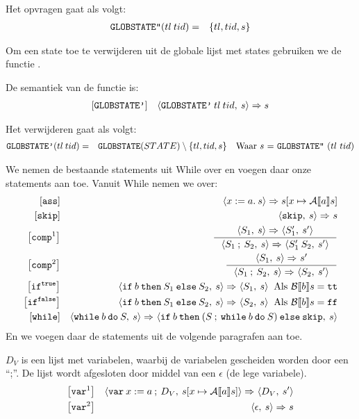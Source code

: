 Het opvragen gaat als volgt:
\begin{eqnarray*}
	\textnormal{\texttt{GLOBSTATE''}}(tl\:tid) &=& \{tl,tid,s\} \\
\end{eqnarray*}

Om een state toe te verwijderen uit de globale lijst met states gebruiken we de functie
.

De semantiek van de functie is:
\begin{eqnarray*}
\left[\textnormal{\texttt{GLOBSTATE'}}\right]&&
\langle\textnormal{\texttt{GLOBSTATE'}}\:tl\:tid,\:s\rangle => s
\end{eqnarray*}

Het verwijderen gaat als volgt:
\begin{eqnarray*}
	\textnormal{\texttt{GLOBSTATE'}}(tl\:tid) &=& \textnormal{\texttt{GLOBSTATE}}(STATE) \setminus \{tl,tid,s\} \quad \textrm{Waar \(s\) = \textnormal{\texttt{GLOBSTATE''}}
	(\(tl\) \(tid\))}\\
\end{eqnarray*}


We nemen de bestaande statements uit While over en voegen daar onze statements aan toe. Vanuit While nemen we over:
\begin{eqnarray*}
\left[\kw{ass}\right]&& \langle x:=a.\:s\rangle=>s[x\mapsto\mathcal{A}|[a|]s] \\
\left[\kw{skip}\right]&& \osstep{}{\kw{skip},\:s}{s} \\
\left[\kw{comp}^1\right]&& \inference{\osstep{}{S_1,\:s}{S'_1,\:s'}}{\osstep{}{S_1\:;\:S_2,\:s}{S'_1\:S_2,\:s'}}\\
\left[\kw{comp}^2\right]&& \inference{\osstep{}{S_1,\:s}{s'}}{\osstep{}{S_1\:;\:S_2,\:s}{S_2,\:s'}}\\
\left[\kw{if}^{\kw{true}}\right]&& \osstep{}{\kw{if}\:b\:\kw{then}\:S_1\:\kw{else}\:S_2,\:s}{S_1,\:s}\:\text{ Als
\(\mathcal{B}|[b|]s = \kw{tt}\)} \\
\left[\kw{if}^{\kw{false}}\right]&&\osstep{}{\kw{if}\:b\:\kw{then}\:S_1\:\kw{else}\:S_2,\:s}{S_2,\:s}\:\text{ Als
\(\mathcal{B}|[b|]s = \kw{ff}\)} \\
\left[\kw{while}\right]&&
\osstep{}{\kw{while}\:b\:\kw{do}\:S,\:s}{\kw{if}\:b\:\kw{then}\:(S\:;\:\kw{while}\:b\:\kw{do}\:S)\:\kw{else}\:\kw{skip},\:s}
\end{eqnarray*}
En we voegen daar de statements uit de volgende paragrafen aan toe.

\(D_V\) is een lijst met variabelen, waarbij de variabelen gescheiden worden door een ``;''. De lijst wordt afgesloten
door middel van een \(\epsilon\) (de lege variabele).
\begin{eqnarray*}
\left[\kw{var}^1\right]&&
\osstep{}
{\kw{var}\:x:= a\:;\:D_V,\:s[x\mapsto\mathcal{A}|[a|]s]}
{D_V,\:s'}%
\\%
\left[\kw{var}^2\right]&&
\osstep{}
{\epsilon,\:s}
{s}
\end{eqnarray*}


